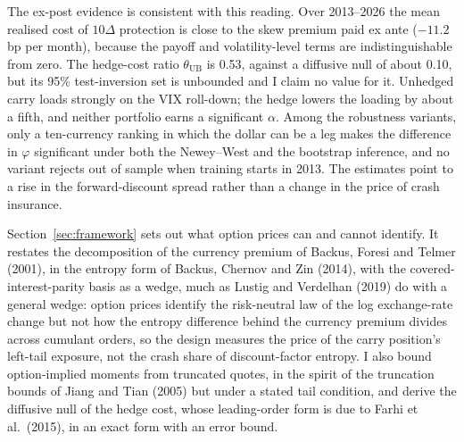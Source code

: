 \documentclass[11pt]{article}
\theoremstyle{result}
\newcommand{\thUB}{\theta_{\mathrm{UB}}}
\newcommand{\D}{\Delta}
\begin{document}
The ex-post evidence is consistent with this reading. Over 2013--2026 the mean realised cost of $10\D$ protection is close to the skew premium paid ex ante ($-11.2$ bp per month), because the payoff and volatility-level terms are indistinguishable from zero. The hedge-cost ratio $\thUB$ is 0.53, against a diffusive null of about 0.10, but its 95\% test-inversion set is unbounded and I claim no value for it. Unhedged carry loads strongly on the VIX roll-down; the hedge lowers the loading by about a fifth, and neither portfolio earns a significant $\alpha$. Among the robustness variants, only a ten-currency ranking in which the dollar can be a leg makes the difference in $\varphi$ significant under both the Newey--West and the bootstrap inference, and no variant rejects out of sample when training starts in 2013. The estimates point to a rise in the forward-discount spread rather than a change in the price of crash insurance.

Section~\ref{sec:framework} sets out what option prices can and cannot identify. It restates the decomposition of the currency premium of Backus, Foresi and Telmer (2001), in the entropy form of Backus, Chernov and Zin (2014), with the covered-interest-parity basis as a wedge, much as Lustig and Verdelhan (2019) do with a general wedge: option prices identify the risk-neutral law of the log exchange-rate change but not how the entropy difference behind the currency premium divides across cumulant orders, so the design measures the price of the carry position's left-tail exposure, not the crash share of discount-factor entropy. I also bound option-implied moments from truncated quotes, in the spirit of the truncation bounds of Jiang and Tian (2005) but under a stated tail condition, and derive the diffusive null of the hedge cost, whose leading-order form is due to Farhi et al.\ (2015), in an exact form with an error bound.
\end{document}
